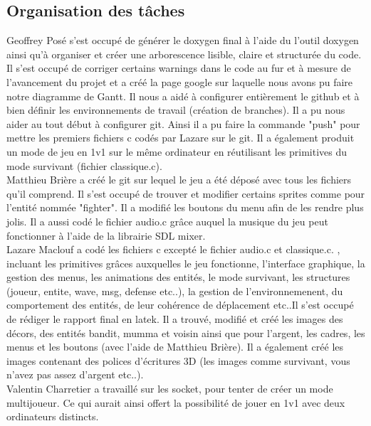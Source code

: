 \documentclass[a4paper,11pt]{article}
\begin{document}
\subsection{Organisation des tâches}

Geoffrey Posé s'est occupé de générer le doxygen final à l'aide du l'outil doxygen ainsi qu'à organiser et créer une arborescence lisible,
claire et structurée du code. Il s'est occupé de corriger certains warnings dans le code au fur et à mesure de l'avancement du projet et a créé la page google sur laquelle nous avons pu faire notre diagramme de Gantt. Il nous a aidé à configurer entièrement le github et à bien définir les environnements de travail (création de branches). Il a pu nous aider au tout début à configurer git. Ainsi il a pu faire la commande "push"
pour mettre les premiers fichiers c codés par Lazare sur le git.
Il a également produit un mode de jeu en 1v1 sur le même ordinateur en réutilisant les primitives du mode survivant (fichier classique.c).\\

Matthieu Brière a créé le git sur lequel le jeu a été déposé avec tous les fichiers qu'il comprend. Il s'est occupé de trouver et modifier certains sprites comme pour l'entité nommée "fighter". Il a modifié les boutons du
menu afin de les rendre plus jolis. 
Il a aussi codé le fichier audio.c grâce auquel la musique du jeu peut fonctionner à l'aide de la librairie SDL mixer.\\

Lazare Maclouf a codé les fichiers c excepté le fichier audio.c et classique.c. , incluant les primitives grâces auxquelles le jeu fonctionne,
l'interface graphique, la gestion des menus, les animations des entités, le mode survivant, les structures (joueur, entite, wave, msg, defense etc..), la gestion de l'environnemenent, 
du comportement des entités, de leur cohérence de déplacement etc..Il s'est occupé de rédiger le rapport final en latek.  Il a trouvé, modifié et créé les images des décors, des entités bandit, mumma et voisin ainsi que pour l'argent,
les cadres, les menus et les boutons (avec l'aide de Matthieu Brière). Il a également créé les images contenant des polices d'écritures 3D (les images comme survivant, vous n'avez pas assez d'argent etc..). \\

Valentin Charretier a travaillé sur les socket, pour tenter de créer un mode multijoueur. Ce qui aurait ainsi offert la possibilité de jouer en 1v1 avec deux
ordinateurs distincts.\\
\end{document}
